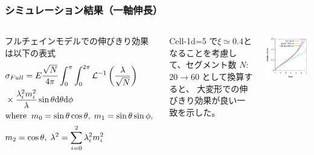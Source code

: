 \documentclass[11pt, dvipdfmx]{beamer}
\begin{document}
\begin{frame}
\frametitle{シミュレーション結果（一軸伸長）}
\begin{columns}[totalwidth=\linewidth]
フルチェインモデルでの伸びきり効果は以下の表式
\tiny
\begin{align*}
&\sigma_{Full} = E \dfrac{\sqrt{N}}{4\pi} \int_0^{\pi} \int_0^{2\pi} \mathcal{L}^{-1} \left( \dfrac{\lambda}{\sqrt{N}} \right) \\
&\times \dfrac{\lambda_i^2 m_i^2}{\lambda} \sin \theta \mathrm{d} \theta \mathrm{d} \phi \\
&\text{where}\;\;m_0 = \sin \theta \cos \theta,\; m_1 = \sin \theta \sin \phi, \; \\
&m_2 = \cos \theta,\;\lambda^2 = \sum_{i=0}^2 \lambda_i^2m_i^2 \notag
\end{align*}
\normalsize

Cell-1d=5 で$\xi\simeq0.4$となることを考慮して、セグメント数 $N$: $20\rightarrow60$ として換算すると、 大変形での伸びきり効果が良い一致を示した。
\vspace{-2mm}

\includegraphics[width=\columnwidth]{./fig/Stretch.pdf}
\end{columns}
\end{frame}
\end{document}
